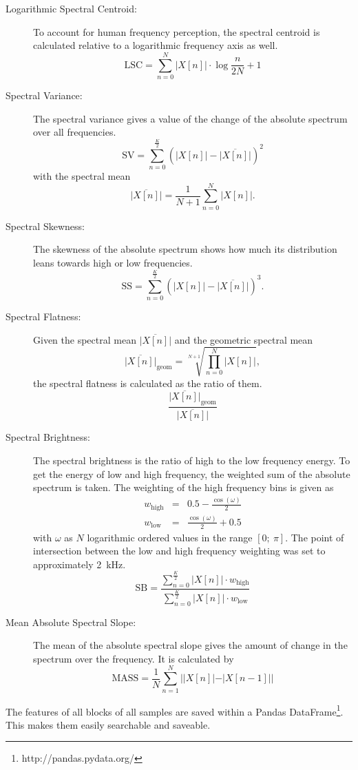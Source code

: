 \begin{description}
    \item[Logarithmic Spectral Centroid:]
        To account for human frequency perception, the spectral centroid is calculated relative to a logarithmic frequency axis as well.
        \[
            \mathrm{LSC} = \sum_{n=0}^{N}{|X[n]| \cdot \log{\frac{n}{2 N}+1}}
        \]
    \item[Spectral Variance:]
        The spectral variance gives a value of the change of the absolute spectrum over all frequencies.
        \[
            \mathrm{SV} = \sum_{n=0}^{\frac{K}{2}}{(|X[n]|-\overline{|X[n]|})^2}
        \]
        with the spectral mean
        \[
            \overline{|X[n]|} = \frac{1}{N+1}\sum_{n=0}^{N}{|X[n]|}.
        \]
    \item[Spectral Skewness:]
    		The skewness of the absolute spectrum shows how much its distribution leans towards high or low frequencies.
        \[
            \mathrm{SS} = \sum_{n=0}^{\frac{K}{2}}{(|X[n]|-\overline{|X[n]|})^3}.
        \]
    \item[Spectral Flatness:]
        Given the spectral mean $\overline{|X[n]|}$ and the geometric spectral mean
        \[
            \overline{|X[n]|}_\mathrm{geom} = \sqrt[N+1]{\prod_{n=0}^{N}{|X[n]|}},
        \]
        the spectral flatness is calculated as the ratio of them.
        \[
        		\frac{\overline{|X[n]|}_\mathrm{geom}}{\overline{|X[n]|}}
        \]
    \item[Spectral Brightness:]
        The spectral brightness is the ratio of high to the low frequency energy. To get the energy of low and high frequency, the weighted sum of the absolute spectrum is taken. The weighting of the high frequency bins is given as
        \begin{eqnarray*}
            w_\mathrm{high} &=& 0.5 - \frac{\cos(\omega)}{2}\\
            w_\mathrm{low} &=& \frac{\cos(\omega)}{2} + 0.5
        \end{eqnarray*}
        with $\omega$ as $N$ logarithmic ordered values in the range $[0;~\pi]$. The point of intersection between the low and high frequency weighting was set to approximately 2~kHz.
        \[
            \mathrm{SB} = \frac{\sum_{n=0}^{\frac{K}{2}}{|X[n]|\cdot w_\mathrm{high}}}{\sum_{n=0}^{\frac{K}{2}}{|X[n]|\cdot w_\mathrm{low} }}
        \]
    \item[Mean Absolute Spectral Slope:]
        The mean of the absolute spectral slope gives the amount of change in the spectrum over the frequency. It is calculated by
        \[
            \mathrm{MASS} = \frac{1}{N}\sum_{n=1}^{N}{||X[n]|-|X[n-1]||}
        \]
\end{description}
The features of all blocks of all samples are saved within a Pandas DataFrame\footnote{http://pandas.pydata.org/}. This makes them easily searchable and saveable.